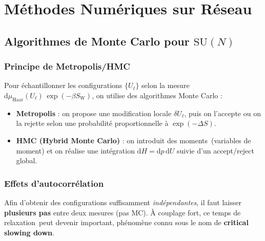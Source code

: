 \chapter{Méthodes Numériques sur Réseau}
\label{ann:C}

\section{Algorithmes de Monte Carlo pour \texorpdfstring{\(\mathrm{SU}(N)\)}{SU(N)}}
\label{sec:C.1}

\subsection*{Principe de Metropolis/HMC}
Pour échantillonner les configurations \(\{U_\ell\}\) selon la mesure
\(\mathrm{d}\mu_{\mathrm{Haar}}(U_\ell)\,\exp(-\beta S_{\mathrm{W}})\),
on utilise des algorithmes Monte Carlo :
\begin{itemize}
	\item \textbf{Metropolis} : on propose une modification locale \(\delta U_\ell\), 
	puis on l’accepte ou on la rejette selon une probabilité proportionnelle 
	à \(\exp(-\Delta S)\).
	\item \textbf{HMC (Hybrid Monte Carlo)} : on introduit des \og moments\fg\ 
	(variables de moment) et on réalise une intégration \(\mathrm{d}H = \mathrm{d}p\,\mathrm{d}U\)
	suivie d’un accept/reject global.
\end{itemize}

\subsection*{Effets d’autocorrélation}
Afin d’obtenir des configurations suffisamment \emph{indépendantes}, il faut
laisser \textbf{plusieurs pas} entre deux mesures (pas MC). À couplage fort,
ce \og temps de relaxation\fg\ peut devenir important, phénomène connu
sous le nom de \textbf{critical slowing down}.

\vspace{1em}

